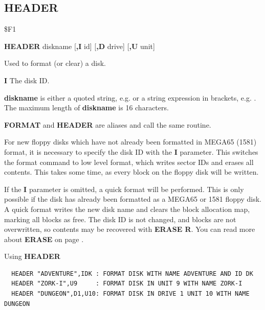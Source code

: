 \subsection{HEADER}
\begin{description}[leftmargin=2cm,style=nextline]
\item [Token:] \$F1
\item [Format:] {\bf HEADER} diskname [{\bf,I} id] [{\bf,D} drive] [{\bf,U} unit]
\item [Usage:]
   Used to format (or clear) a disk.

   {\bf I} The disk ID.

   {\bf diskname} is either a quoted string, e.g.  or
   a string expression in brackets, e.g. .
   The maximum length of {\bf diskname} is 16 characters.

   \drivedefinition

   \unitdefinition

\item [Remarks:] {\bf FORMAT} and {\bf HEADER} are aliases and call the same routine.

   For new floppy disks which have not already been formatted in MEGA65 (1581) format,
   it is necessary to specify the disk ID with the
   {\bf I} parameter. This switches the format command to low level
   format, which writes sector IDs and erases all contents.
   This takes some time, as every block on the floppy disk will be written.

   If the {\bf I} parameter is omitted, a quick format will
   be performed. This is only possible if the disk has already been formatted
   as a MEGA65 or 1581 floppy disk.
   A quick format writes the new disk name and clears the
   block allocation map, marking all blocks as free.
   The disk ID is not changed, and blocks are not overwritten,
   so contents may be recovered with {\bf ERASE R}.
   You can read more about {\bf ERASE} on page \pageref{erasecommand}.

\item [Examples:] Using {\bf HEADER}
\begin{tcolorbox}[colback=black,coltext=white]
\verbatimfont{\codefont}
\begin{verbatim}
  HEADER "ADVENTURE",IDK : FORMAT DISK WITH NAME ADVENTURE AND ID DK
  HEADER "ZORK-I",U9     : FORMAT DISK IN UNIT 9 WITH NAME ZORK-I
  HEADER "DUNGEON",D1,U10: FORMAT DISK IN DRIVE 1 UNIT 10 WITH NAME DUNGEON
\end{verbatim}
\end{tcolorbox}
\end{description}

